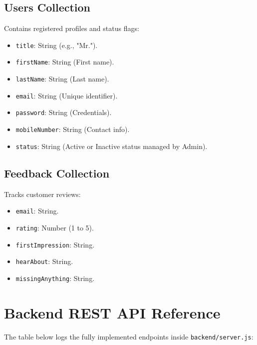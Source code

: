 \documentclass[12pt,a4paper]{article}
\begin{document}
\subsection{Users Collection}
Contains registered profiles and status flags:
\begin{itemize}
    \item \texttt{title}: String (e.g., "Mr.").
    \item \texttt{firstName}: String (First name).
    \item \texttt{lastName}: String (Last name).
    \item \texttt{email}: String (Unique identifier).
    \item \texttt{password}: String (Credentials).
    \item \texttt{mobileNumber}: String (Contact info).
    \item \texttt{status}: String (Active or Inactive status managed by Admin).
\end{itemize}

\subsection{Feedback Collection}
Tracks customer reviews:
\begin{itemize}
    \item \texttt{email}: String.
    \item \texttt{rating}: Number (1 to 5).
    \item \texttt{firstImpression}: String.
    \item \texttt{hearAbout}: String.
    \item \texttt{missingAnything}: String.
\end{itemize}

\newpage
\section{Backend REST API Reference}
The table below logs the fully implemented endpoints inside \texttt{backend/server.js}:
\end{document}
